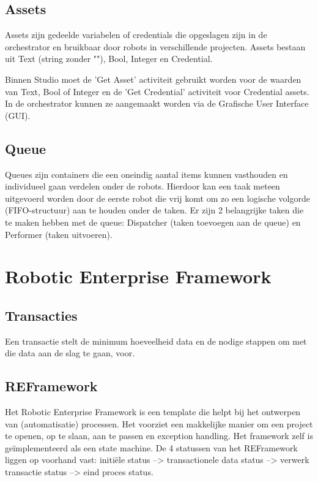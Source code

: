 \subsection{Assets}
Assets zijn gedeelde variabelen of credentials die opgeslagen zijn in de orchestrator en bruikbaar door robots in verschillende projecten. Assets bestaan uit Text (string zonder ""), Bool, Integer en Credential.

Binnen Studio moet  de 'Get Asset' activiteit gebruikt worden voor de waarden van Text, Bool of Integer en de 'Get Credential' activiteit voor Credential assets. In de orchestrator kunnen ze aangemaakt worden via de Grafische User Interface (GUI).

\subsection{Queue}
Queues zijn containers die een oneindig aantal items kunnen vasthouden en individueel gaan verdelen onder de robots. Hierdoor kan een taak meteen uitgevoerd worden door de eerste robot die vrij komt om zo een logische volgorde (FIFO-structuur) aan te houden onder de taken. Er zijn 2 belangrijke taken die te maken hebben met de queue: Dispatcher (taken toevoegen aan de queue) en Performer (taken uitvoeren).

\section{Robotic Enterprise Framework}
\subsection{Transacties}
Een transactie stelt de minimum hoeveelheid data en de nodige stappen om met die data aan de slag te gaan, voor.

\subsection{REFramework}
Het Robotic Enterprise Framework is een template die helpt bij het ontwerpen van (automatisatie) processen. Het voorziet een makkelijke manier om een project te openen, op te slaan, aan te passen en exception handling. Het framework zelf is geïmplementeerd als een state machine. De 4 statussen van het REFramework liggen op voorhand vast: initiële status --> transactionele data status --> verwerk transactie status --> eind proces status.